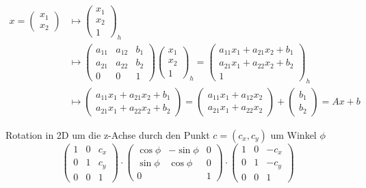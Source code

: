 \begin{align*}
  x =
  \begin{pmatrix}
    x_1 \\
    x_2
  \end{pmatrix}
  &\mapsto
  \begin{pmatrix}
    x_1 \\
    x_2 \\
    1
  \end{pmatrix}_h \\
  &\mapsto
  \begin{pmatrix}
    a_{11} & a_{12} & b_1 \\
    a_{21} & a_{22} & b_2 \\
    0      & 0      & 1
  \end{pmatrix}
  \begin{pmatrix}
    x_1 \\
    x_2 \\
    1
  \end{pmatrix}_h
  =
  \begin{pmatrix}
    a_{11}x_1 + a_{21}x_2 + b_1 \\
    a_{21}x_1 + a_{22}x_2 + b_2 \\
    1
  \end{pmatrix}_h \\
  &\mapsto
  \begin{pmatrix}
    a_{11}x_1 + a_{21}x_2 + b_1 \\
    a_{21}x_1 + a_{22}x_2 + b_2
  \end{pmatrix}
  =
  \begin{pmatrix}
    a_{11}x_1 + a_{12}x_2 \\
    a_{21}x_1 + a_{22}x_2
  \end{pmatrix}
  +
  \begin{pmatrix}
    b_1 \\
    b_2
  \end{pmatrix}
  =
  Ax + b
\end{align*}

\begin{Beispiel}
  Rotation in 2D um die z-Achse durch den Punkt $c = (c_x, c_y)$ um Winkel $\phi$
  \[
    \begin{pmatrix}
      1 & 0 & c_x \\
      0 & 1 & c_y \\
      0 & 0 & 1
    \end{pmatrix}
    \cdot
    \begin{pmatrix}
      \cos \phi & -\sin \phi & 0 \\
      \sin \phi & \cos \phi  & 0 \\
      0         &            & 1
    \end{pmatrix}
    \cdot
    \begin{pmatrix}
      1 & 0 & -c_x \\
      0 & 1 & -c_y \\
      0 & 0 & 1
    \end{pmatrix}
  \]
\end{Beispiel}

